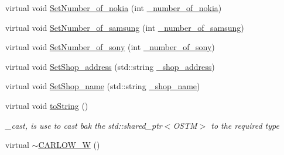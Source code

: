 \begin{DoxyCompactItemize}
\item 
virtual void \hyperlink{class_c_a_r_l_o_w___w_af0f395409df02a42b3e9448d027d0776_af0f395409df02a42b3e9448d027d0776}{Set\+Number\+\_\+of\+\_\+nokia} (int \hyperlink{class_c_a_r_l_o_w___w_ac4c7e47711cc4c9e0bc01fc37cabe7d1_ac4c7e47711cc4c9e0bc01fc37cabe7d1}{\+\_\+number\+\_\+of\+\_\+nokia})
\item 
virtual void \hyperlink{class_c_a_r_l_o_w___w_a6e629d8043c4c4266ecafa9f6a3e6447_a6e629d8043c4c4266ecafa9f6a3e6447}{Set\+Number\+\_\+of\+\_\+samsung} (int \hyperlink{class_c_a_r_l_o_w___w_ae47f54289c630e38341ce8b2c8decf0f_ae47f54289c630e38341ce8b2c8decf0f}{\+\_\+number\+\_\+of\+\_\+samsung})
\item 
virtual void \hyperlink{class_c_a_r_l_o_w___w_ab255132fb2ef5678d00c74f90acdf2dd_ab255132fb2ef5678d00c74f90acdf2dd}{Set\+Number\+\_\+of\+\_\+sony} (int \hyperlink{class_c_a_r_l_o_w___w_a080de2e63290db84a0b9898682b74f6e_a080de2e63290db84a0b9898682b74f6e}{\+\_\+number\+\_\+of\+\_\+sony})
\item 
virtual void \hyperlink{class_c_a_r_l_o_w___w_a6f66cd4c060b2b1ac6640768ad5c56e4_a6f66cd4c060b2b1ac6640768ad5c56e4}{Set\+Shop\+\_\+address} (std\+::string \hyperlink{class_c_a_r_l_o_w___w_acaa886b26f5a60d500f13709340d34cf_acaa886b26f5a60d500f13709340d34cf}{\+\_\+shop\+\_\+address})
\item 
virtual void \hyperlink{class_c_a_r_l_o_w___w_a9d0dcf25c0a9eb8be530c27bd2cf8933_a9d0dcf25c0a9eb8be530c27bd2cf8933}{Set\+Shop\+\_\+name} (std\+::string \hyperlink{class_c_a_r_l_o_w___w_ad3ae4ca82f06287d8ad5bec07a43561a_ad3ae4ca82f06287d8ad5bec07a43561a}{\+\_\+shop\+\_\+name})
\item 
virtual void \hyperlink{class_c_a_r_l_o_w___w_a79e683650f861b59752fb027a5f16e5a_a79e683650f861b59752fb027a5f16e5a}{to\+String} ()
\begin{DoxyCompactList}\small\item\em \+\_\+cast, is use to cast bak the std\+::shared\+\_\+ptr$<$\+O\+S\+T\+M$>$ to the required type \end{DoxyCompactList}\item 
virtual \hyperlink{class_c_a_r_l_o_w___w_aa628d46e58dfd0517f24499eca88138b_aa628d46e58dfd0517f24499eca88138b}{$\sim$\+C\+A\+R\+L\+O\+W\+\_\+W} ()
\end{DoxyCompactItemize}
